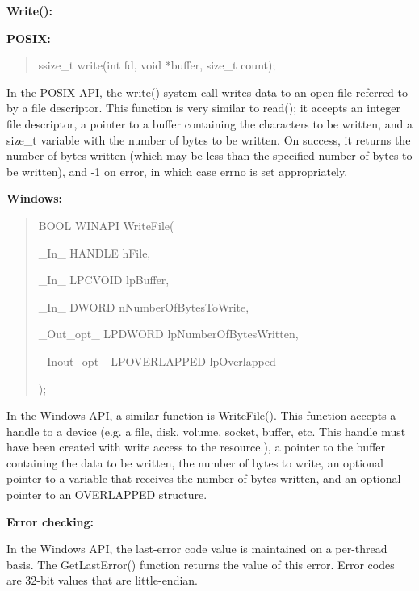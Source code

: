\documentclass[letterpaper,10pt,titlepage]{article}
\newcommand{\tab}{\hspace*{2em}} %
\begin{document}
\begin{enumerate}
\textbf{Write():}

\textbf{POSIX:}

\begin{quote}
ssize\_t write(int fd, void *buffer, size\_t count);
\end{quote}

\tab In the POSIX API, the write() system call writes data to an open file referred to by a file descriptor. This function is very similar to read(); it accepts an integer file descriptor, a pointer to a buffer containing the characters to be written, and a size\_t variable with the number of bytes to be written. On success, it returns the number of bytes written (which may be less than the specified number of bytes to be written), and -1 on error, in which case errno is set appropriately. \newline%

\textbf{Windows:} 

\begin{quote}
BOOL WINAPI WriteFile(

\tab\_In\_         HANDLE hFile,

\tab\_In\_         LPCVOID lpBuffer,

\tab\_In\_         DWORD nNumberOfBytesToWrite,

\tab\_Out\_opt\_    LPDWORD lpNumberOfBytesWritten,

\tab\_Inout\_opt\_  LPOVERLAPPED lpOverlapped

);
\end{quote}


\tab In the Windows API, a similar function is WriteFile(). This function accepts a handle to a device (e.g. a file, disk, volume, socket, buffer, etc. This handle must have been created with write access to the resource.), a pointer to the buffer containing the data to be written, the number of bytes to write, an optional pointer to a variable that receives the number of bytes written, and an optional pointer to an OVERLAPPED structure. \newline %


\textbf{Error checking:}\newline


\tab In the Windows API, the last-error code value is maintained on a per-thread basis. The GetLastError() function returns the value of this error. Error codes are 32-bit values that are little-endian.\newline %


\end{enumerate}
\end{document}
